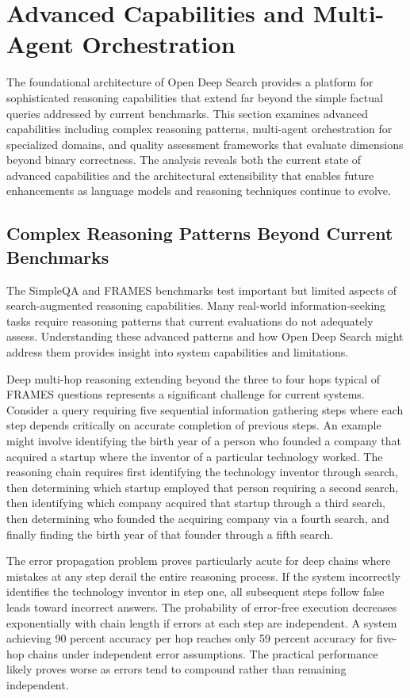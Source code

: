 \section{Advanced Capabilities and Multi-Agent Orchestration}

The foundational architecture of Open Deep Search provides a platform for sophisticated reasoning capabilities that extend far beyond the simple factual queries addressed by current benchmarks. This section examines advanced capabilities including complex reasoning patterns, multi-agent orchestration for specialized domains, and quality assessment frameworks that evaluate dimensions beyond binary correctness. The analysis reveals both the current state of advanced capabilities and the architectural extensibility that enables future enhancements as language models and reasoning techniques continue to evolve.

\subsection{Complex Reasoning Patterns Beyond Current Benchmarks}

The SimpleQA and FRAMES benchmarks test important but limited aspects of search-augmented reasoning capabilities. Many real-world information-seeking tasks require reasoning patterns that current evaluations do not adequately assess. Understanding these advanced patterns and how Open Deep Search might address them provides insight into system capabilities and limitations.

Deep multi-hop reasoning extending beyond the three to four hops typical of FRAMES questions represents a significant challenge for current systems. Consider a query requiring five sequential information gathering steps where each step depends critically on accurate completion of previous steps. An example might involve identifying the birth year of a person who founded a company that acquired a startup where the inventor of a particular technology worked. The reasoning chain requires first identifying the technology inventor through search, then determining which startup employed that person requiring a second search, then identifying which company acquired that startup through a third search, then determining who founded the acquiring company via a fourth search, and finally finding the birth year of that founder through a fifth search.

The error propagation problem proves particularly acute for deep chains where mistakes at any step derail the entire reasoning process. If the system incorrectly identifies the technology inventor in step one, all subsequent steps follow false leads toward incorrect answers. The probability of error-free execution decreases exponentially with chain length if errors at each step are independent. A system achieving 90 percent accuracy per hop reaches only 59 percent accuracy for five-hop chains under independent error assumptions. The practical performance likely proves worse as errors tend to compound rather than remaining independent.

